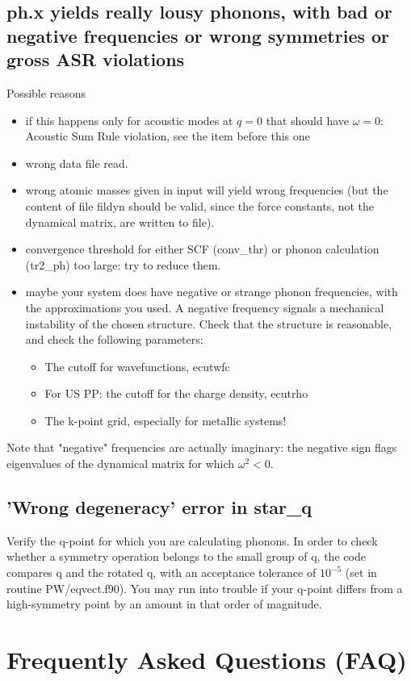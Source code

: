\documentclass[12pt,a4paper]{article}
\begin{document}
\subsection{ph.x yields really lousy phonons, with bad or negative
  frequencies or wrong symmetries or gross ASR violations} 
Possible reasons
\begin{itemize}
\item if this happens only for acoustic modes at $q=0$ that should
  have $\omega=0$: Acoustic Sum Rule violation, see the item before
  this one 
\item wrong data file read.
\item wrong atomic masses given in input will yield wrong frequencies
  (but the content of file fildyn should be valid, since the force
  constants, not the dynamical matrix, are written to file). 
\item convergence threshold for either SCF (conv\_thr) or phonon
  calculation (tr2\_ph) too large: try to reduce them. 
\item maybe your system does have negative or strange phonon
  frequencies, with the approximations you used. A negative frequency
  signals a mechanical instability of the chosen structure. Check that
  the structure is reasonable, and check the following parameters: 
\begin{itemize}
\item The cutoff for wavefunctions, ecutwfc
\item For US PP: the cutoff for the charge density, ecutrho
\item The k-point grid, especially for metallic systems!
\end{itemize}
\end{itemize}
Note that "negative" frequencies are actually imaginary: the negative
sign flags eigenvalues of the dynamical matrix for which $\omega^2 <
0$. 

\subsection{'Wrong degeneracy' error in star\_q}
Verify the q-point for which you are calculating phonons. In order to
check whether a symmetry operation belongs to the small group of q,
the code compares q and the rotated q, with an acceptance tolerance of  
$10^{-5}$ (set in routine PW/eqvect.f90). You may run into trouble if
your q-point differs from a high-symmetry point by an amount in that
order of magnitude.

\section{Frequently Asked Questions (FAQ)}
\end{document}
